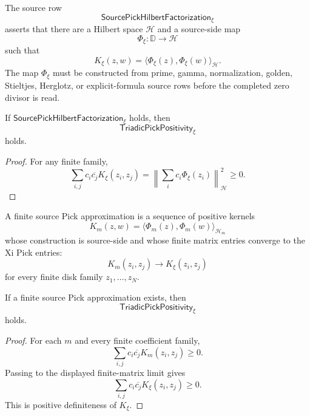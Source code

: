 \begin{definition}
\label{def:rh-source-pick-hilbert-factorization}
The source row
$$
\mathsf{SourcePickHilbertFactorization}_{\xi}
$$
asserts that there are a Hilbert space $\mathcal H$ and a source-side
map
$$
\Phi_{\xi}:\mathbb D\to\mathcal H
$$
such that
$$
K_{\xi}(z,w)=\langle\Phi_{\xi}(z),\Phi_{\xi}(w)\rangle_{\mathcal H}.
$$
The map $\Phi_{\xi}$ must be constructed from prime, gamma,
normalization, golden, Stieltjes, Herglotz, or explicit-formula source
rows before the completed zero divisor is read.
\end{definition}

\begin{theorem}
\label{thm:rh-hilbert-factorization-supplies-pick-positivity}
If $\mathsf{SourcePickHilbertFactorization}_{\xi}$ holds, then
$$
\mathsf{TriadicPickPositivity}_{\xi}
$$
holds.
\end{theorem}

\begin{proof}
For any finite family,
$$
\sum_{i,j}c_i\overline{c_j}K_{\xi}(z_i,z_j)
=
\left\|
\sum_i c_i\Phi_{\xi}(z_i)
\right\|_{\mathcal H}^2
\ge0.
$$
\end{proof}

\begin{definition}
\label{def:rh-finite-source-pick-approximation}
A finite source Pick approximation is a sequence of positive kernels
$$
K_m(z,w)=\langle\Phi_m(z),\Phi_m(w)\rangle_{\mathcal H_m}
$$
whose construction is source-side and whose finite matrix entries
converge to the Xi Pick entries:
$$
K_m(z_i,z_j)\to K_{\xi}(z_i,z_j)
$$
for every finite disk family $z_1,\ldots,z_N$.
\end{definition}

\begin{theorem}
\label{thm:rh-finite-pick-approximations-close-pick-row}
If a finite source Pick approximation exists, then
$$
\mathsf{TriadicPickPositivity}_{\xi}
$$
holds.
\end{theorem}

\begin{proof}
For each $m$ and every finite coefficient family,
$$
\sum_{i,j}c_i\overline{c_j}K_m(z_i,z_j)\ge0.
$$
Passing to the displayed finite-matrix limit gives
$$
\sum_{i,j}c_i\overline{c_j}K_{\xi}(z_i,z_j)\ge0.
$$
This is positive definiteness of $K_{\xi}$.
\end{proof}

